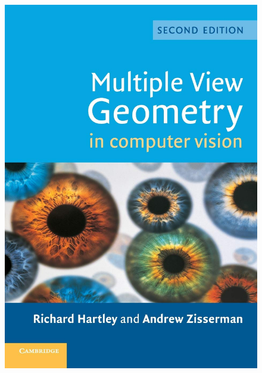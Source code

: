 \documentclass[a4paper,titlepaget]{article}
\begin{document}
\begin{figure}[htpb]
\begin{minipage}{.2\textwidth}
\includegraphics[width=\textwidth, height=0.2\textheight]{images/obj3}
\end{minipage} 
\hspace{.05\textwidth}
\begin{minipage}{.2\textwidth}  

\end{minipage}
\end{figure}
\end{document}
